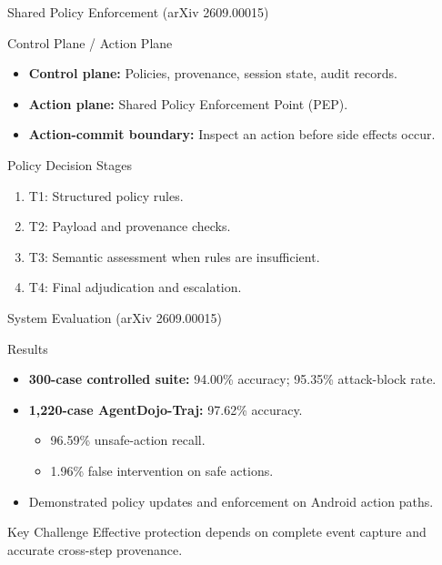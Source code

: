 \documentclass[aspectratio=169]{beamer}
\begin{document}
\begin{frame}{Shared Policy Enforcement (arXiv 2609.00015)}
    \begin{block}{Control Plane / Action Plane}
        \begin{itemize}
            \item \textbf{Control plane:} Policies, provenance, session state, audit records.
            \item \textbf{Action plane:} Shared Policy Enforcement Point (PEP).
            \item \textbf{Action-commit boundary:} Inspect an action before side effects occur.
        \end{itemize}
    \end{block}
    \begin{block}{Policy Decision Stages}
        \begin{enumerate}
            \item T1: Structured policy rules.
            \item T2: Payload and provenance checks.
            \item T3: Semantic assessment when rules are insufficient.
            \item T4: Final adjudication and escalation.
        \end{enumerate}
    \end{block}
\end{frame}

\begin{frame}{System Evaluation (arXiv 2609.00015)}
    \begin{block}{Results}
        \begin{itemize}
            \item \textbf{300-case controlled suite:} 94.00\% accuracy; 95.35\% attack-block rate.
            \item \textbf{1,220-case AgentDojo-Traj:} 97.62\% accuracy.
                \begin{itemize}
                    \item 96.59\% unsafe-action recall.
                    \item 1.96\% false intervention on safe actions.
                \end{itemize}
            \item Demonstrated policy updates and enforcement on Android action paths.
        \end{itemize}
    \end{block}
    \begin{alertblock}{Key Challenge}
        Effective protection depends on complete event capture and accurate cross-step provenance.
    \end{alertblock}
\end{frame}
\end{document}
